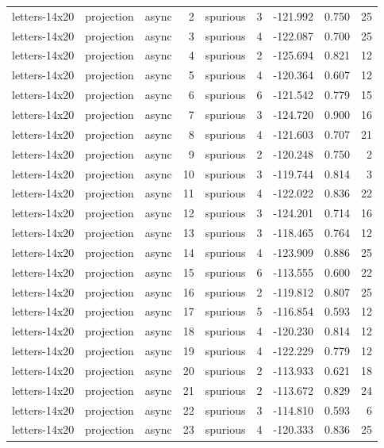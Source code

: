 \begin{tabular}{lllrlrrrr}
letters-14x20 & projection & async & 2 & spurious & 3 & -121.992 & 0.750 & 25 \\
letters-14x20 & projection & async & 3 & spurious & 4 & -122.087 & 0.700 & 25 \\
letters-14x20 & projection & async & 4 & spurious & 2 & -125.694 & 0.821 & 12 \\
letters-14x20 & projection & async & 5 & spurious & 4 & -120.364 & 0.607 & 12 \\
letters-14x20 & projection & async & 6 & spurious & 6 & -121.542 & 0.779 & 15 \\
letters-14x20 & projection & async & 7 & spurious & 3 & -124.720 & 0.900 & 16 \\
letters-14x20 & projection & async & 8 & spurious & 4 & -121.603 & 0.707 & 21 \\
letters-14x20 & projection & async & 9 & spurious & 2 & -120.248 & 0.750 & 2 \\
letters-14x20 & projection & async & 10 & spurious & 3 & -119.744 & 0.814 & 3 \\
letters-14x20 & projection & async & 11 & spurious & 4 & -122.022 & 0.836 & 22 \\
letters-14x20 & projection & async & 12 & spurious & 3 & -124.201 & 0.714 & 16 \\
letters-14x20 & projection & async & 13 & spurious & 3 & -118.465 & 0.764 & 12 \\
letters-14x20 & projection & async & 14 & spurious & 4 & -123.909 & 0.886 & 25 \\
letters-14x20 & projection & async & 15 & spurious & 6 & -113.555 & 0.600 & 22 \\
letters-14x20 & projection & async & 16 & spurious & 2 & -119.812 & 0.807 & 25 \\
letters-14x20 & projection & async & 17 & spurious & 5 & -116.854 & 0.593 & 12 \\
letters-14x20 & projection & async & 18 & spurious & 4 & -120.230 & 0.814 & 12 \\
letters-14x20 & projection & async & 19 & spurious & 4 & -122.229 & 0.779 & 12 \\
letters-14x20 & projection & async & 20 & spurious & 2 & -113.933 & 0.621 & 18 \\
letters-14x20 & projection & async & 21 & spurious & 2 & -113.672 & 0.829 & 24 \\
letters-14x20 & projection & async & 22 & spurious & 3 & -114.810 & 0.593 & 6 \\
letters-14x20 & projection & async & 23 & spurious & 4 & -120.333 & 0.836 & 25 \\

\end{tabular}
